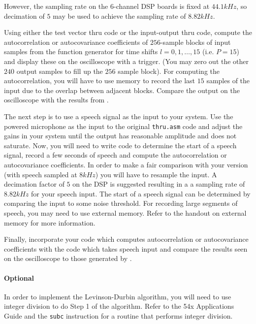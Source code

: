 However, the sampling rate on the 6-channel 
DSP boards is fixed at $44.1kHz$, so decimation of $5$ may be used 
to achieve the sampling rate of $8.82kHz$.  

Using either the test vector thru code or the input-output thru code, 
compute the autocorrelation or 
autocovariance coefficients of $256$-sample blocks of input samples from 
the function generator for time shifts $l=0,1,\ldots,15$ (i.e. $P=15$) and 
display these on the oscilloscope with a trigger.  (You may zero out 
the other $240$ output samples to fill up the $256$ sample block).  
For computing the autocorrelation, 
you will have to use memory to record the last $15$ samples of the input 
due to the overlap between adjacent blocks.  
Compare the output on the oscilloscope with the results from \matlab.

The next step is to use a speech signal as the input to your system.  
Use the powered microphone as the input to the original
\verb+thru.asm+ code and adjust the gains in your system until 
the output has reasonable amplitude and does not saturate.  
Now, you will need to write code to determine 
the start of a speech signal, record a few seconds of speech and 
compute the autocorrelation or autocovariance 
coefficients.  
In order to make a fair comparison with your \matlab version (with
speech sampled at $8 kHz$) you will have to resample the input.
A decimation factor of $5$ on the DSP is suggested resulting in a 
a sampling rate of $8.82 kHz$ for your speech input.
The start of a speech signal can be determined by comparing 
the input to some noise threshold.  For recording large segments of 
speech, you may need to use external memory. Refer to the handout on 
external memory for more information.

Finally, incorporate your code which computes autocorrelation or 
autocovariance coefficients with the code which takes speech 
input and compare the results seen on the oscilloscope to those 
generated by \matlab.

\paragraph{Optional}
In order to implement the Levinson-Durbin algorithm, you will need to 
use integer division to do Step 1 of the algorithm.  
Refer to the 54x Applications Guide and the \verb+subc+ 
instruction for a routine that performs integer division.

